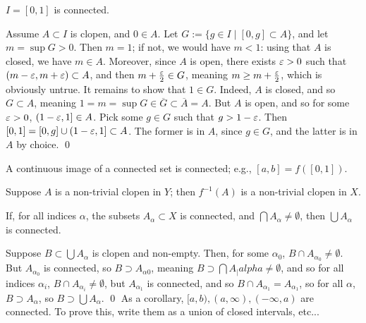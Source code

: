 \begin{simplethm}
    $I = [0, 1]$ is connected.
\end{simplethm}
\noindent Assume $A \subset I$ is clopen, and $0 \in A$. Let $G := \{g \in I \mid [0, g] \subset A\}$, and let $m = \sup G > 0$. Then $m = 1$; if not, we would have $m < 1$: using that $A$ is closed, we have $m \in A$. Moreover, since $A$ is open, there exists $\varepsilon > 0$ such that $(m - \varepsilon, m + \varepsilon) \subset A$, and then $m + \frac{\varepsilon}{2} \in G$, meaning $m \geq m + \frac{\varepsilon}{2}$, which is obviously untrue. It remains to show that $1 \in G$. Indeed, $A$ is closed, and so $G \subset A$, meaning $1 = m = \sup G \in \overline{G} \subset \overline{A} = A$. But $A$ is open, and so for some $\varepsilon > 0$, $(1 - \varepsilon, 1] \in A$. Pick some $g \in G$ such that $g > 1 - \varepsilon$. Then $[0, 1] = [0, g] \cup (1 - \varepsilon, 1] \subset A$. The former is in $A$, since $g \in G$, and the latter is in $A$ by choice. \qed
\begin{simpleclaim}
    A continuous image of a connected set is connected; e.g., $[a, b] = f([0, 1])$.
\end{simpleclaim}
\noindent Suppose $A$ is a non-trivial clopen in $Y$; then $f^{-1}(A)$ is a non-trivial clopen in $X$.
\begin{simpleclaim}
    If, for all indices $\alpha$, the subsets $A_\alpha \subset X$ is connected, and $\bigcap A_\alpha \neq \emptyset$, then $\bigcup A_\alpha$ is connected.
\end{simpleclaim}
Suppose $B \subset \bigcup A_\alpha$ is clopen and non-empty. Then, for some $\alpha_0$, $B \cap A_{\alpha_0} \neq \emptyset$. But $A_{\alpha_0}$ is connected, so $B \supset A_{\alpha{0}}$, meaning $B \supset \bigcap A_|alpha \neq \emptyset$, and so for all indices $\alpha_i$, $B \cap A_{\alpha_i} \neq \emptyset$, but $A_{\alpha_1}$ is connected, and so $B \cap A_{\alpha_1} = A_{\alpha_1}$, so for all $\alpha$, $B \supset A_\alpha$, so $B \supset \bigcup A_\alpha$. \qed
\medskip\newline
\noindent As a corollary, $[a, b), (a, \infty), (-\infty, a)$ are connected. To prove this, write them as a union of closed intervals, etc...